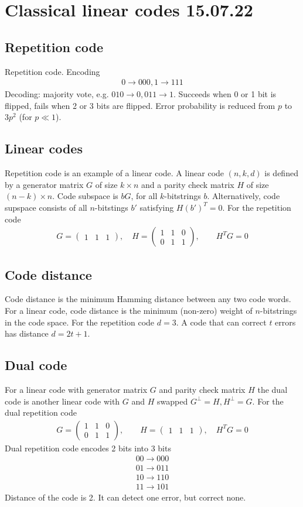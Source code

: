 \documentclass[12 pt]{article}
\begin{document}
\tableofcontents
\section{Classical linear codes 15.07.22}
\subsection{Repetition code}
Repetition code. Encoding
\begin{align}
0\to000, 1\to111
\end{align}
Decoding: majority vote, e.g. $010\to0, 011\to1$. Succeeds when 0 or 1 bit is flipped, fails when 2 or 3 bits are flipped. Error probability is reduced from $p$ to $3p^2$ (for $p\ll1$).
\subsection{Linear codes}
Repetition code is an example of a linear code. A linear code $(n, k, d)$ is defined by a generator matrix $G$ of size $k\times n$ and a parity check matrix $H$ of size $(n-k)\times n$. Code subspace is $bG$, for all $k$-bitstrings $b$. Alternatively, code supspace consists of all $n$-bitstings $b'$ satisfying $H(b')^T=0$. For the repetition code
\begin{align}
G=\begin{pmatrix}1&1&1\end{pmatrix},\quad H=\begin{pmatrix}1&1&0\\0&1&1\end{pmatrix},\qquad H^T G=0
\end{align}
\subsection{Code distance}
Code distance is the minimum Hamming distance between any two code words. For a linear code, code distance is the minimum (non-zero) weight of $n$-bitstrings in the code space. For the repetition code $d=3$. A code that can correct $t$ errors has distance $d=2t+1$.
\subsection{Dual code}
For a linear code with generator matrix $G$ and parity check matrix $H$ the dual code is another linear code with $G$ and $H$ swapped $G^{\perp}=H, H^{\perp}=G$. For the dual repetition code
\begin{align}
G=\begin{pmatrix}1&1&0\\0&1&1\end{pmatrix},\qquad H=\begin{pmatrix}1&1&1\end{pmatrix},\quad H^TG=0
\end{align}
Dual repetition code encodes 2 bits into 3 bits
\begin{align}
00\to 000\\
01\to 011\\
10\to 110\\
11\to 101
\end{align}
Distance of the code is 2. It can detect one error, but correct none.
\end{document}
